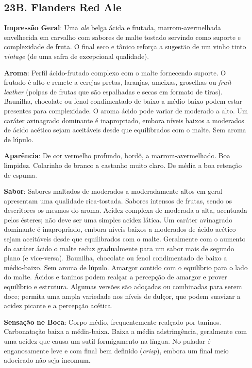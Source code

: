 \subsection*{23B. Flanders Red Ale}
\textbf{Impressão Geral}: Uma \textit{ale} belga ácida e frutada, marrom-avermelhada envelhecida em carvalho com sabores de malte tostado servindo como suporte e complexidade de fruta. O final seco e tânico reforça a sugestão de um vinho tinto \textit{vintage} (de uma safra de excepcional qualidade).

\textbf{Aroma}: Perfil ácido-frutado complexo com o malte fornecendo suporte. O frutado é alto e remete a cerejas pretas, laranjas, ameixas, groselhas ou \textit{fruit leather} (polpas de frutas que são espalhadas e secas em formato de tiras). Baunilha, chocolate ou fenol condimentado de baixo a médio-baixo podem estar presentes para complexidade. O aroma ácido pode variar de moderado a alto. Um caráter avinagrado dominante é inapropriado, embora níveis baixos a moderados de ácido acético sejam aceitáveis desde que equilibrados com o malte. Sem aroma de lúpulo.

\textbf{Aparência}: De cor vermelho profundo, bordô, a marrom-avermelhado. Boa limpidez. Colarinho de branco a castanho muito claro. De média a boa retenção de espuma.

\textbf{Sabor}: Sabores maltados de moderados a moderadamente altos em geral apresentam uma qualidade rica-tostada. Sabores intensos de frutas, sendo os descritores os mesmos do aroma. Acidez complexa de moderada a alta, acentuada pelos ésteres; não deve ser uma simples acidez lática. Um caráter avinagrado dominante é inapropriado, embora níveis baixos a moderados de ácido acético sejam aceitáveis desde que equilibrados com o malte. Geralmente com o aumento do caráter ácido o malte reduz gradualmente para um sabor mais de segundo plano (e vice-versa). Baunilha, chocolate ou fenol condimentado de baixo a médio-baixo. Sem aroma de lúpulo. Amargor contido com o equilíbrio para o lado do malte. Ácidos e taninos podem realçar a percepção de amargor e prover equilíbrio e estrutura. Algumas versões são adoçadas ou combinadas para serem doce; permita uma ampla variedade nos níveis de dulçor, que podem suavizar a acidez picante e a percepção acética.

\textbf{Sensação ne Boca}: Corpo médio, frequentemente realçado por taninos. Carbonatação baixa a média-baixa. Baixa a média adstringência, geralmente com uma acidez que causa um sutil formigamento na língua. No paladar é enganosamente leve e com final bem definido (\textit{crisp}), embora um final meio adocicado não seja incomum.

